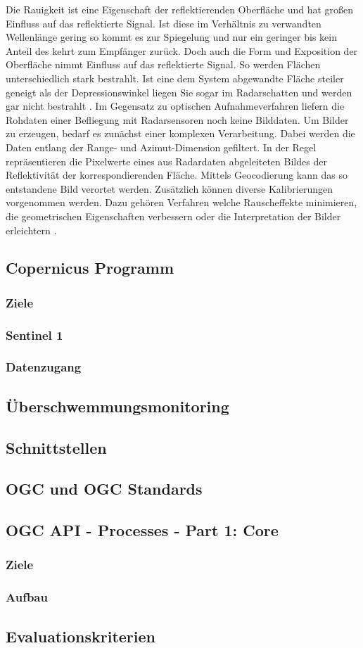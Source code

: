 Die Rauigkeit ist eine Eigenschaft der reflektierenden Oberfläche und hat großen Einfluss auf das reflektierte Signal. Ist diese im Verhältnis zu verwandten
Wellenlänge gering so kommt es zur Spiegelung und nur ein geringer bis kein Anteil des kehrt zum Empfänger zurück. Doch auch die Form und Exposition der Oberfläche nimmt 
Einfluss auf das reflektierte Signal. So werden Flächen unterschiedlich stark bestrahlt. Ist eine dem System abgewandte Fläche steiler geneigt als der Depressionswinkel liegen Sie
sogar im Radarschatten und werden gar nicht bestrahlt \cite{einfuehrung_in_fernerkundung}. 
Im Gegensatz zu optischen Aufnahmeverfahren liefern die Rohdaten einer Befliegung mit Radarsensoren noch keine Bilddaten. Um Bilder zu erzeugen, bedarf es zunächst einer komplexen
Verarbeitung. Dabei werden die Daten entlang der Range- und Azimut-Dimension gefiltert. In der Regel repräsentieren die Pixelwerte eines aus Radardaten abgeleiteten Bildes der 
Reflektivität der korrespondierenden Fläche. Mittels Geocodierung kann das so entstandene Bild verortet werden.
Zusätzlich können diverse Kalibrierungen vorgenommen werden. Dazu gehören Verfahren welche Rauscheffekte minimieren, die geometrischen Eigenschaften verbessern oder die Interpretation
der Bilder erleichtern \cite{tutorial_on_sar}. 

\subsection{Copernicus Programm}
\subsubsection{Ziele}
\subsubsection{Sentinel 1}
\subsubsection{Datenzugang}
\subsection{Überschwemmungsmonitoring}
\subsection{Schnittstellen}
\subsection{OGC und OGC Standards}
\subsection{OGC API - Processes - Part 1: Core}
\subsubsection{Ziele}
\subsubsection{Aufbau}
\subsection{Evaluationskriterien}